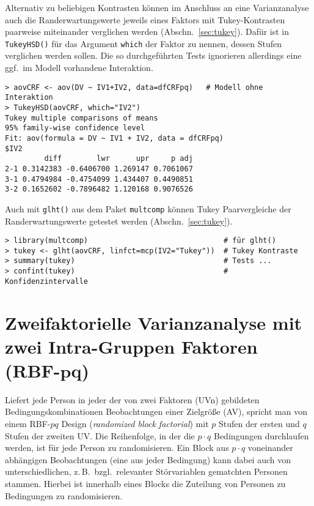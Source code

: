 Alternativ zu beliebigen Kontrasten können im Anschluss an eine Varianzanalyse auch die Randerwartungswerte jeweils eines Faktors mit Tukey-Kontrasten paarweise miteinander verglichen werden (Abschn.\ \ref{sec:tukey}). Dafür ist in \lstinline!TukeyHSD()! für das Argument \lstinline!which! der Faktor zu nennen, dessen Stufen verglichen werden sollen. Die so durchgeführten Tests ignorieren allerdings eine ggf.\ im Modell vorhandene Interaktion.
\begin{lstlisting}
> aovCRF <- aov(DV ~ IV1+IV2, data=dfCRFpq)   # Modell ohne Interaktion
> TukeyHSD(aovCRF, which="IV2")
Tukey multiple comparisons of means
95% family-wise confidence level
Fit: aov(formula = DV ~ IV1 + IV2, data = dfCRFpq)
$IV2
         diff        lwr      upr     p adj
2-1 0.3142383 -0.6406700 1.269147 0.7061067
3-1 0.4794984 -0.4754099 1.434407 0.4490851
3-2 0.1652602 -0.7896482 1.120168 0.9076526
\end{lstlisting}

Auch mit \lstinline!glht()! aus dem Paket \lstinline!multcomp! können Tukey Paarvergleiche der Randerwartungswerte getestet werden (Abschn.\ \ref{sec:tukey}).
\begin{lstlisting}
> library(multcomp)                               # für glht()
> tukey <- glht(aovCRF, linfct=mcp(IV2="Tukey"))  # Tukey Kontraste
> summary(tukey)                                  # Tests ...
> confint(tukey)                                  # Konfidenzintervalle
\end{lstlisting}

\section[Zweifaktorielle Varianzanalyse mit zwei Intra-Gruppen Faktoren (RBF-\texorpdfstring{$pq$}{pq})]{Zweifaktorielle Varianzanalyse mit zwei Intra-Gruppen Faktoren (RBF-$\bm{pq}$)}
\label{sec:RBFpq}

Liefert jede Person in jeder der von zwei Faktoren (UVn) gebildeten Bedingungskombinationen Beobachtungen einer Zielgröße (AV), spricht man von einem RBF-$pq$ Design (\emph{randomized block factorial}) mit $p$ Stufen der ersten und $q$ Stufen der zweiten UV\@. Die Reihenfolge, in der die $p \cdot q$ Bedingungen durchlaufen werden, ist für jede Person zu randomisieren. Ein Block aus $p \cdot q$ voneinander abhängigen Beobachtungen (eine aus jeder Bedingung) kann dabei auch von unterschiedlichen, z.\,B.\ bzgl.\ relevanter Störvariablen gematchten Personen stammen. Hierbei ist innerhalb eines Blocks die Zuteilung von Personen zu Bedingungen zu randomisieren.

